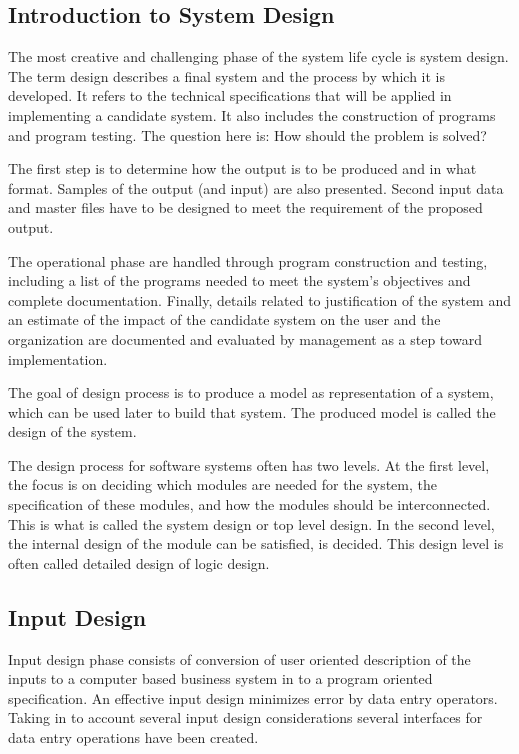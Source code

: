 \documentclass[a4paper,12pt]{article}
\begin{document}
\subsection{Introduction to System Design}\vspace{2mm}
 The most creative and challenging phase of the system life cycle is system design. The term design describes a final system and the process by which it is developed. It refers to the technical specifications that will be applied in implementing a candidate system. It also includes the construction of programs and program testing. The question here is: How should the problem is solved?\par\vspace{2mm}
The first step is to determine how the output is to be produced and in what format. Samples of the output (and input) are also presented. Second input data and master files have to be designed to meet the requirement of the proposed output.
\par\vspace{2mm} The operational phase are handled through program construction and testing, including a list of the programs needed to meet the system’s objectives and complete documentation. Finally, details related to justification of the system and an estimate of the impact of the candidate system on the user and the organization are documented and evaluated by management as a step toward implementation.
\par\vspace{2mm}
 The goal of design process is to produce a model as representation of a system, which can be used later to build that system. The produced model is called the design of the system.
\par\vspace{2mm}
 The design process for software systems often has two levels. At the first level, the focus is on deciding which modules are needed for the system, the specification of these modules, and how the modules should be interconnected. This is what is called the system design or top level design. In the second level, the internal design of the module can be satisfied, is decided. This design level is often called detailed design of logic design. 
\par\vspace{2mm}
\newpage
\subsection{Input Design}\vspace{2mm}
 Input design phase consists of conversion of user oriented description of the inputs to a computer based business system in to a program oriented specification. An effective input design minimizes error by data entry operators. Taking in to account several input design considerations several interfaces for data entry operations have been created.
\end{document}
